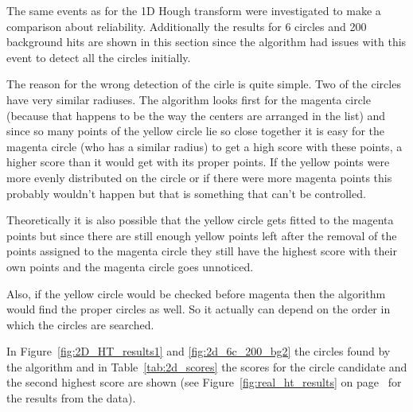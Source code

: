 \documentclass[11pt]{scrreprt}
\begin{document}
The same events as for the 1D
Hough transform were investigated to make a comparison about reliability. Additionally the results for 6 circles
and 200 background hits are shown in this section since the algorithm had issues with this event to detect
all the circles initially. 

The reason for the wrong detection of the cirle is quite simple. Two of the circles have very similar radiuses. 
The algorithm looks first for the magenta circle (because that happens to be the way the centers are arranged in the list) 
and since so many points of the yellow circle lie so close together it is easy for the magenta circle (who has a similar radius) 
to get a high score with these points, a higher score than it would get with its proper points. If the yellow points were more evenly 
distributed on the circle or if there were more magenta points this probably wouldn't happen but that is something that can't be controlled.

Theoretically it is also possible that the yellow circle gets fitted to the
magenta points but since there are still enough yellow points left after the removal 
of the points assigned to the magenta circle they still have the highest score with 
their own points and the magenta circle goes unnoticed.

Also, if the yellow circle would be checked before magenta then the algorithm
would find the proper circles as well. So it actually can depend on the order
in which the circles are searched.

In Figure~\ref{fig:2D_HT_results1} and \ref{fig:2d_6c_200_bg2} the circles found by the algorithm and in Table~\ref{tab:2d_scores} the scores
for the circle candidate and the second highest score are shown (see Figure~\ref{fig:real_ht_results} on page~\pageref{fig:real_ht_results}
for the results from the data).
\end{document}
